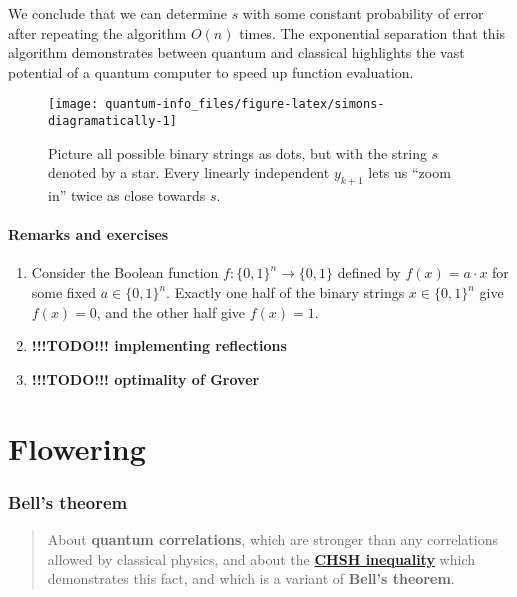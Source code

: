 \documentclass[fleqn]{article}
\providecommand{\tightlist}{%
  \setlength{\itemsep}{0pt}\setlength{\parskip}{0pt}}
\let\oldsection\section
\renewcommand\section{\clearpage\oldsection}
\let\oldpart\part
\renewcommand\part{\clearpage\oldpart}
\begin{document}
We conclude that we can determine \(s\) with some constant probability of error after repeating the algorithm \(O(n)\) times.
The exponential separation that this algorithm demonstrates between quantum and classical highlights the vast potential of a quantum computer to speed up function evaluation.



\begin{figure}[H]

{\centering \texttt{[image: quantum-info\_files/figure-latex/simons-diagramatically-1]} 

}

\caption{Picture all possible binary strings as dots, but with the string \(s\) denoted by a star. Every linearly independent \(y_{k+1}\) lets us ``zoom in'' twice as close towards \(s\).}\label{fig:simons-diagramatically}
\end{figure}

\hypertarget{remarks-and-exercises-2}{%
\subsection{Remarks and exercises}\label{remarks-and-exercises-2}}

\begin{enumerate}
\def\labelenumi{\arabic{enumi}.}
\tightlist
\item
  Consider the Boolean function \(f\colon\{0,1\}^n\to\{0,1\}\) defined by \(f(x) = a\cdot x\) for some fixed \(a\in\{0,1\}^n\).
  Exactly one half of the binary strings \(x\in\{0,1\}^n\) give \(f(x)=0\), and the other half give \(f(x)=1\).
\item
  \textbf{!!!TODO!!! implementing reflections}
\item
  \textbf{!!!TODO!!! optimality of Grover}
\end{enumerate}

\hypertarget{part-flowering}{%
\part{Flowering}\label{part-flowering}}

\hypertarget{chapter7}{%
\section{Bell's theorem}\label{chapter7}}

\begin{quote}
About \textbf{quantum correlations}, which are stronger than any correlations allowed by classical physics, and about the \href{https://en.wikipedia.org/wiki/CHSH_inequality}{\textbf{CHSH inequality}} which demonstrates this fact, and which is a variant of \textbf{Bell's theorem}.
\end{quote}
\end{document}
